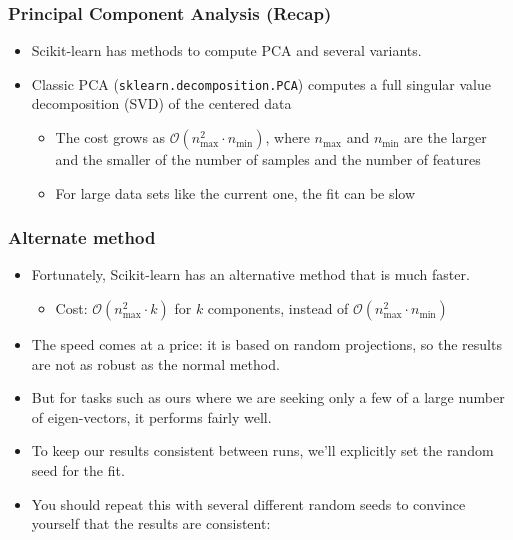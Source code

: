 





\begin{frame}[fragile]
\frametitle{Principal Component Analysis (Recap)}
\begin{itemize}
	\item Scikit-learn has methods to compute PCA and several variants. 
	\item Classic PCA (\texttt{sklearn.decomposition.PCA}) computes a full singular value decomposition (SVD) of the centered data
	\begin{itemize}
	\item The cost grows as
	$\mathcal{O}(n_{\max}^2 \cdot n_{\min})$, where $n_{\max}$ and $n_{\min}$ are the larger and the smaller of the number of samples and the number of features
	\item For large data sets like the current one, the fit can be slow
	\end{itemize} 
\end{itemize}
\end{frame}

\begin{frame}[fragile]\frametitle{Alternate method}

\begin{itemize}
\item Fortunately, Scikit-learn has an alternative method that is much faster.
\begin{itemize}
\item Cost: $\mathcal{O}(n_{\max}^2 \cdot k)$ for $k$ components, instead of $\mathcal{O}(n_{\max}^2 \cdot n_{\min})$
\end{itemize} 
\item The speed comes at a price: it is based on random projections, so the results are not as robust as the normal method. 
\item But for tasks such as ours where we are seeking only a few of a large number of eigen-vectors, it performs fairly well. 
\item To keep our results consistent between runs, we'll explicitly set the random seed for the fit. 
\item You should repeat this with several different random seeds to convince yourself that the results are consistent:
\end{itemize}
\end{frame}


